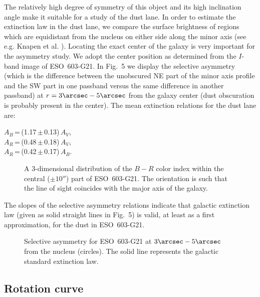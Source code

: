 \documentclass{aa}
\begin{document}
The  relatively  high degree of symmetry  of this  object and its high
inclination  angle make it suitable  for a study of the dust lane.  In
order to estimate the extinction  law in the dust lane, we compare the
surface  brightness  of  regions  which are  equidistant  from the
nucleus on either  side along the minor  axis (see e.g.  Knapen et al.
\cite{k}).  Locating the exact center of the galaxy is very  important
for the asymmetry  study.  We adopt the center  position as determined
from the  $I$-band  image of  ESO~603-G21.  In Fig.~5 we  display  the
selective asymmetry (which is the difference between the unobscured NE
part of the minor axis profile and the SW part in one passband  versus
the same difference in another passband) at $r=3\arcsec-5\arcsec$ from
the  galaxy  center  (dust  obscuration  is  probably  present  in the
center).  The mean extinction relations for the dust lane are:

\begin{center}
$A_B$\,=\,(1.17\,$\pm$\,0.13)\,$A_V$, \\
$A_R$\,=\,(0.48\,$\pm$\,0.18)\,$A_V$, \\
$A_R$\,=\,(0.42\,$\pm$\,0.17)\,$A_B$. 
\end{center}


\begin{figure}[!ht]
\caption[4]{A 3-dimensional distribution of the $B-R$  color  index  
within the central ($\pm 10''$) part of ESO~603-G21. The orientation is
such that the line of sight coincides with the major axis of the 
galaxy. }
\end{figure}


The slopes of the selective asymmetry relations indicate that galactic
extinction law (given as solid straight  lines in Fig.~5) is valid, at
least as a first approximation, for the dust in ESO~603-G21.

\begin{figure}
\caption[5]{Selective asymmetry for ESO~603-G21 at 
$3\arcsec-5\arcsec$ from the nucleus (circles).
 The solid line represents the galactic 
standard extinction law.}
\end{figure}



\subsection{Rotation curve}
\end{document}
